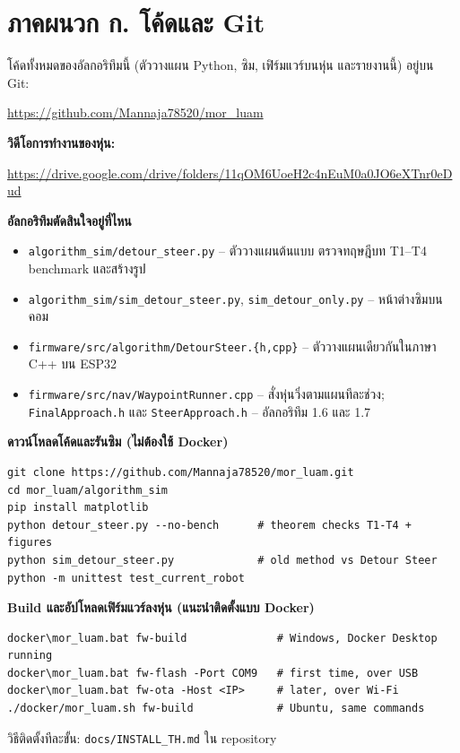 \documentclass[11pt,a4paper]{article}
\begin{document}
\clearpage
\section*{ภาคผนวก ก. โค้ดและ Git}
โค้ดทั้งหมดของอัลกอริทึมนี้ (ตัววางแผน Python, ซิม, เฟิร์มแวร์บนหุ่น และรายงานนี้) อยู่บน Git:

\begin{center}
\large\url{https://github.com/Mannaja78520/mor_luam} 
\end{center}

\noindent\textbf{วิดีโอการทำงานของหุ่น:}
\begin{center}
\url{https://drive.google.com/drive/folders/11qOM6UoeH2c4nEuM0a0JO6eXTnr0eDud}
\end{center}
\par\medskip

\noindent\textbf{อัลกอริทึมตัดสินใจอยู่ที่ไหน}
\begin{itemize}
\item \texttt{algorithm\_sim/detour\_steer.py} -- ตัววางแผนต้นแบบ ตรวจทฤษฎีบท T1--T4 benchmark และสร้างรูป
\item \texttt{algorithm\_sim/sim\_detour\_steer.py}, \texttt{sim\_detour\_only.py} -- หน้าต่างซิมบนคอม
\item \texttt{firmware/src/algorithm/DetourSteer.\{h,cpp\}} -- ตัววางแผนเดียวกันในภาษา C++ บน ESP32
\item \texttt{firmware/src/nav/WaypointRunner.cpp} -- สั่งหุ่นวิ่งตามแผนทีละช่วง;
\texttt{FinalApproach.h} และ \texttt{SteerApproach.h} -- อัลกอริทึม 1.6 และ 1.7
\end{itemize}

\noindent\textbf{ดาวน์โหลดโค้ดและรันซิม (ไม่ต้องใช้ Docker)}
\begin{lstlisting}[numbers=none]
git clone https://github.com/Mannaja78520/mor_luam.git
cd mor_luam/algorithm_sim
pip install matplotlib
python detour_steer.py --no-bench      # theorem checks T1-T4 + figures
python sim_detour_steer.py             # old method vs Detour Steer
python -m unittest test_current_robot
\end{lstlisting}

\noindent\textbf{Build และอัปโหลดเฟิร์มแวร์ลงหุ่น (แนะนำติดตั้งแบบ Docker)}
\begin{lstlisting}[numbers=none]
docker\mor_luam.bat fw-build              # Windows, Docker Desktop running
docker\mor_luam.bat fw-flash -Port COM9   # first time, over USB
docker\mor_luam.bat fw-ota -Host <IP>     # later, over Wi-Fi
./docker/mor_luam.sh fw-build             # Ubuntu, same commands
\end{lstlisting}
วิธีติดตั้งทีละขั้น: \texttt{docs/INSTALL\_TH.md} ใน repository
\end{document}
